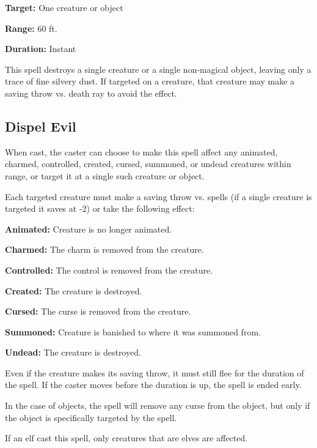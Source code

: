 \begin{multicols*}{2}
{\textbf{Target:} One creature or object

\textbf{Range:} 60 ft.

\textbf{Duration:} Instant}

This spell destroys a single creature or a single non-magical object, leaving only a trace of fine silvery dust. If targeted on a creature, that creature may make a saving throw vs. death ray to avoid the effect.

\subsection{Dispel Evil}\label{spell:Dispel Evil}

When cast, the caster can choose to make this spell affect any animated, charmed, controlled, created, cursed, summoned, or undead creatures within range, or target it at a single such creature or object.

Each targeted creature must make a saving throw vs. spells (if a single creature is targeted it saves at -2) or take the following effect:

\textbf{Animated:} Creature is no longer animated.

\textbf{Charmed:} The charm is removed from the creature.

\textbf{Controlled:} The control is removed from the creature.

\textbf{Created:} The creature is destroyed.

\textbf{Cursed:} The curse is removed from the creature.

\textbf{Summoned:} Creature is banished to where it was summoned from.

\textbf{Undead:} The creature is destroyed.

Even if the creature makes its saving throw, it must still flee for the duration of the spell. If the caster moves before the duration is up, the spell is ended early.

In the case of objects, the spell will remove any curse from the object, but only if the object is specifically targeted by the spell.

If an elf cast this spell, only creatures that are elves are affected.


\end{multicols*}
